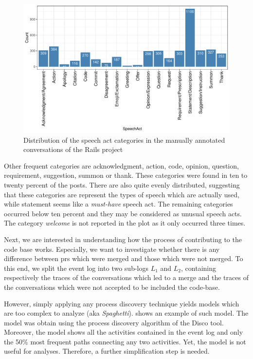 \begin{figure}
	\centering
	\includegraphics[width=\linewidth]{figures/speechActCount}
	\caption[Speech act categories manually annotated on Rails project]{Distribution of the speech act categories in the manually annotated conversations of the Rails project}
	\label{fig:speechactcount}
\end{figure}


Other frequent categories are acknowledgment, action, code, opinion, question, requirement, suggestion, summon or thank. These categories were found in ten to twenty percent of the posts. There are also quite evenly distributed, suggesting that these categories are represent the types of speech which are actually used, while statement seems like a \emph{must-have} speech act. The remaining categories occurred below ten percent and they may be considered as unusual speech acts. The category \emph{welcome} is not reported in the plot as it only occurred three times. 


Next, we are interested in understanding how the process of contributing to the code base works. Especially, we want to investigate whether there is any difference between \glspl{pr} which were merged and those which were not merged. To this end, we split the event log into two sub-logs $L_1$ and $L_2$, containing respectively the traces of the conversations which led to a merge and the traces of the conversations which were not accepted to be included the code-base. 

However, simply applying any process discovery technique yields models which are too complex to analyze (aka \emph{Spaghetti}).  shows an example of such model. The model was obtain using the process discovery algorithm of the Disco tool. Moreover, the model shows all the activities contained in the event log and only the 50\% most frequent paths connecting any two activities. Yet, the model is not useful for analyses. Therefore, a further simplification step is needed. 


